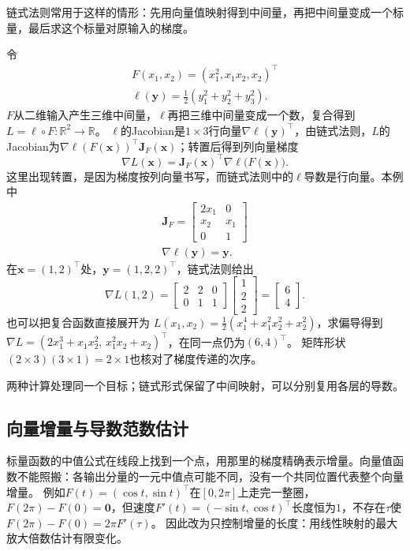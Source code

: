 链式法则常用于这样的情形：先用向量值映射得到中间量，再把中间量变成一个标量，最后求这个标量对原输入的梯度。
\begin{example}[从中间向量求回复合目标的梯度]
\label{ex:analysis-chain-rule-calculation}
令
\[
 \begin{gathered}
F(x_1,x_2)=(x_1^2,x_1x_2,x_2)^\top\\
\ell(\bm y)=\frac12(y_1^2+y_2^2+y_3^2).
 \end{gathered}
\]
$F$从二维输入产生三维中间量，$\ell$再把三维中间量变成一个数，复合得到$L=\ell\circ F:\mathbb R^2\to\mathbb R$。
$\ell$的Jacobian是$1\times3$行向量$\nabla\ell(\bm y)^\top$，由链式法则，$L$的Jacobian为$\nabla\ell(F(\bm x))^\top\bm J_F(\bm x)$；转置后得到列向量梯度
\[
  \nabla L(\bm x)=\bm J_F(\bm x)^\top\nabla\ell\bigl(F(\bm x)\bigr).
\]
这里出现转置，是因为梯度按列向量书写，而链式法则中的$\ell$导数是行向量。本例中
\[
\begin{gathered}
\bm J_F=\begin{bmatrix}2x_1&0\\x_2&x_1\\0&1\end{bmatrix}\\
\nabla\ell(\bm y)=\bm y.
\end{gathered}
\]
在$\bm x=(1,2)^\top$处，$\bm y=(1,2,2)^\top$，链式法则给出
\[
  \nabla L(1,2)
  =\begin{bmatrix}2&2&0\\0&1&1\end{bmatrix}
    \begin{bmatrix}1\\2\\2\end{bmatrix}
  =\begin{bmatrix}6\\4\end{bmatrix}.
\]
也可以把复合函数直接展开为
$L(x_1,x_2)=\tfrac12(x_1^4+x_1^2x_2^2+x_2^2)$，求偏导得到
$\nabla L=(2x_1^3+x_1x_2^2,\,x_1^2x_2+x_2)^\top$，在同一点仍为$(6,4)^\top$。
矩阵形状$(2\times3)(3\times1)=2\times1$也核对了梯度传递的次序。
\end{example}

两种计算处理同一个目标；链式形式保留了中间映射，可以分别复用各层的导数。

\subsection{向量增量与导数范数估计}

标量函数的中值公式在线段上找到一个点，用那里的梯度精确表示增量。向量值函数不能照搬：各输出分量的一元中值点可能不同，没有一个共同位置代表整个向量增量。
例如$F(t)=(\cos t,\sin t)^\top$在$[0,2\pi]$上走完一整圈，$F(2\pi)-F(0)=\bm 0$，但速度$F'(t)=(-\sin t,\cos t)^\top$长度恒为$1$，不存在$\tau$使$F(2\pi)-F(0)=2\pi F'(\tau)$。
因此改为只控制增量的长度：用线性映射的最大放大倍数估计有限变化。

